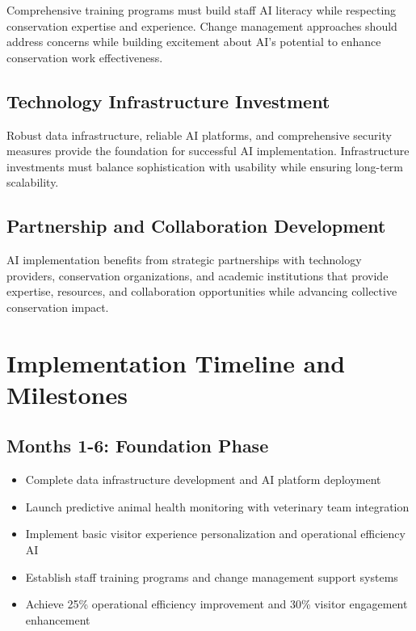 \documentclass[
  Letterpaper,
]{scrbook}
\providecommand{\tightlist}{%
  \setlength{\itemsep}{0pt}\setlength{\parskip}{0pt}}
\begin{document}
Comprehensive training programs must build staff AI literacy while
respecting conservation expertise and experience. Change management
approaches should address concerns while building excitement about AI's
potential to enhance conservation work effectiveness.

\subsection*{Technology Infrastructure
Investment}\label{technology-infrastructure-investment}

Robust data infrastructure, reliable AI platforms, and comprehensive
security measures provide the foundation for successful AI
implementation. Infrastructure investments must balance sophistication
with usability while ensuring long-term scalability.

\subsection*{Partnership and Collaboration
Development}\label{partnership-and-collaboration-development}

AI implementation benefits from strategic partnerships with technology
providers, conservation organizations, and academic institutions that
provide expertise, resources, and collaboration opportunities while
advancing collective conservation impact.

\section*{Implementation Timeline and
Milestones}\label{implementation-timeline-and-milestones}


\subsection*{Months 1-6: Foundation
Phase}\label{months-1-6-foundation-phase}

\begin{itemize}
\tightlist
\item
  Complete data infrastructure development and AI platform deployment
\item
  Launch predictive animal health monitoring with veterinary team
  integration
\item
  Implement basic visitor experience personalization and operational
  efficiency AI
\item
  Establish staff training programs and change management support
  systems
\item
  Achieve 25\% operational efficiency improvement and 30\% visitor
  engagement enhancement
\end{itemize}
\end{document}

